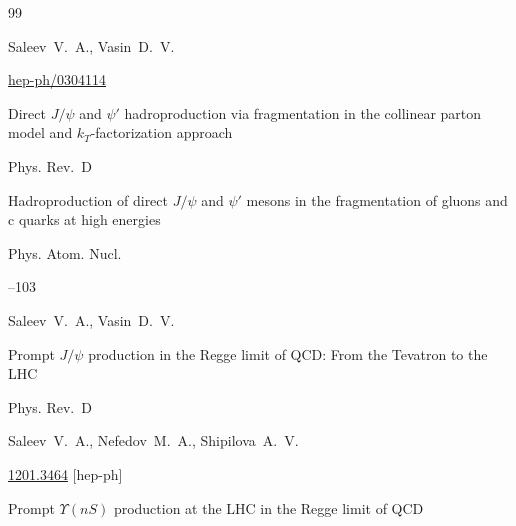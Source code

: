 \begin{thebibliography}{99}

\by  Saleev~V.~A.,  Vasin~D.~V.

\arxiv \href{http://arxiv.org/abs/hep-ph/0304114}{hep-ph/0304114}

\paper Direct $J / \psi$ and $\psi'$ hadroproduction via fragmentation in the collinear parton model and $k_T$-factorization approach


\jour Phys. Rev.~D 





 



\paper Hadroproduction of direct $J/\psi$ and $\psi'$ mesons in the fragmentation of gluons and c quarks at high energies


\jour Phys. Atom. Nucl.



--103

\by  Saleev~V.~A.,  Vasin~D.~V.


 




\paper Prompt $J / \psi$ production in the Regge limit of QCD: From the Tevatron to the LHC


\jour Phys. Rev.~D 



\by Saleev~V.~A., Nefedov~M.~A., Shipilova~A.~V.



\arxiv \href{http://arxiv.org/abs/1201.3464}{1201.3464} [hep-ph]




\paper Prompt $\Upsilon  ( n S )$ production at the LHC in the Regge limit of QCD


\end{thebibliography}
